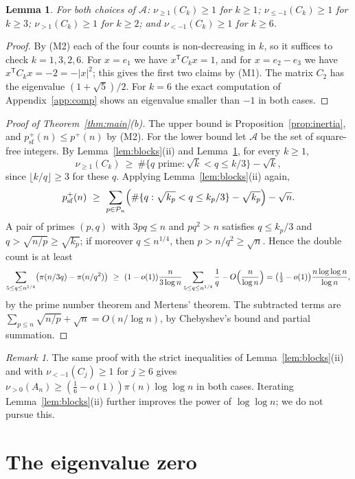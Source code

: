 \documentclass[11pt]{amsart}
\newtheorem{lemma}[theorem]{Lemma}
\theoremstyle{definition}
\theoremstyle{remark}
\newtheorem{remark}[theorem]{Remark}
\newcommand{\pp}{p^{+}}
\newcommand{\nuge}[1]{\nu_{\ge #1}}
\newcommand{\nule}[1]{\nu_{\le #1}}
\begin{document}
\begin{lemma}\label{lem:base}
For both choices of $\mathcal A$: $\nuge1(C_k)\ge1$ for $k\ge1$; $\nule{-1}(C_k)\ge1$ for $k\ge3$; $\nu_{>1}(C_k)\ge1$ for $k\ge2$; and $\nu_{<-1}(C_k)\ge1$ for $k\ge6$.
\end{lemma}
\begin{proof}
By (M2) each of the four counts is non-decreasing in $k$, so it suffices to check $k=1,3,2,6$. For $x=e_1$ we have $x^{\mathsf T}C_kx=1$, and for $x=e_2-e_3$ we have $x^{\mathsf T}C_kx=-2=-|x|^2$; this gives the first two claims by (M1). The matrix $C_2$ has the eigenvalue $(1+\sqrt5)/2$. For $k=6$ the exact computation of Appendix~\ref{app:comp} shows an eigenvalue smaller than $-1$ in both cases.
\end{proof}

\begin{proof}[Proof of Theorem~\ref{thm:main}(b)]
The upper bound is Proposition~\ref{prop:inertia}, and $\pp_{\mathrm{sf}}(n)\le\pp(n)$ by (M2). For the lower bound let $\mathcal A$ be the set of square-free integers. By Lemma~\ref{lem:blocks}(ii) and Lemma~\ref{lem:base}, for every $k\ge1$,
\[
\nuge1(C_k)\ \ge\ \#\{q\text{ prime}:\sqrt k<q\le k/3\}-\sqrt k ,
\]
since $\lfloor k/q\rfloor\ge3$ for these $q$. Applying Lemma~\ref{lem:blocks}(ii) again,
\[
\pp_{\mathrm{sf}}(n)\ \ge\ \sum_{p\in\mathcal P_n}\Bigl(\#\{q:\sqrt{k_p}<q\le k_p/3\}-\sqrt{k_p}\Bigr)-\sqrt n .
\]
A pair of primes $(p,q)$ with $3pq\le n$ and $pq^2>n$ satisfies $q\le k_p/3$ and $q>\sqrt{n/p}\ge\sqrt{k_p}$; if moreover $q\le n^{1/4}$, then $p>n/q^2\ge\sqrt n$. Hence the double count is at least
\[
\sum_{5\le q\le n^{1/4}}\bigl(\pi(n/3q)-\pi(n/q^2)\bigr)
\ \ge\ (1-o(1))\frac{n}{3\log n}\sum_{5\le q\le n^{1/4}}\frac1q-O\Bigl(\frac n{\log n}\Bigr)
=\bigl(\tfrac13-o(1)\bigr)\frac{n\log\log n}{\log n},
\]
by the prime number theorem and Mertens' theorem. The subtracted terms are $\sum_{p\le n}\sqrt{n/p}+\sqrt n=O(n/\log n)$, by Chebyshev's bound and partial summation.
\end{proof}

\begin{remark}
The same proof with the strict inequalities of Lemma~\ref{lem:blocks}(ii) and with $\nu_{<-1}(C_j)\ge1$ for $j\ge6$ gives $\nu_{>0}(A_n)\ge(\tfrac16-o(1))\pi(n)\log\log n$ in both cases. Iterating Lemma~\ref{lem:blocks}(ii) further improves the power of $\log\log n$; we do not pursue this.
\end{remark}

\section{The eigenvalue zero}
\end{document}
